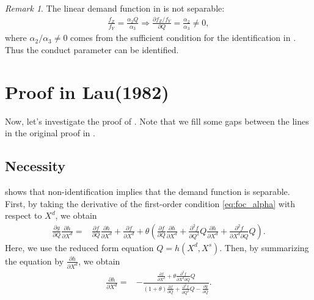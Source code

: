 \documentclass[11pt, a4paper]{article}
\theoremstyle{remark}
\newtheorem{remark}{Remark}
\begin{document}
\begin{remark}
    The linear demand function in \citet{bresnahan1982oligopoly} is not separable:
    \begin{align}
        \frac{f_Z}{f_Y} = \frac{\alpha_2 Q}{\alpha_3} \Longrightarrow \frac{\partial f_Z/f_Y}{\partial Q} = \frac{\alpha_2}{\alpha_3} \ne 0,
    \end{align}
    where $\alpha_2/\alpha_3 \ne 0$ comes from the sufficient condition for the identification in \citet{matsumura2023resolving}.
    Thus the conduct parameter can be identified.
\end{remark}



\section{Proof in Lau(1982)}\label{sec:proof_lau}
Now, let's investigate the proof of \citet{lau1982identifying}.
Note that we fill some gaps between the lines in the original proof in \citet{lau1982identifying}.

\subsection{Necessity}
\citet{lau1982identifying} shows that non-identification implies that the demand function is separable.
First, by taking the derivative of the first-order condition \eqref{eq:foc_alpha} with respect to $X^{d}$, we obtain
\begin{align}
    \frac{\partial g}{\partial Q}\frac{\partial h}{\partial X^{d}} = & \frac{\partial f}{\partial Q}\frac{\partial h}{\partial X^{d}} + \frac{\partial f}{\partial X^{d}} + \theta\left(\frac{\partial f}{\partial Q}\frac{\partial h}{\partial X^{d}}  + \frac{\partial^2 f}{\partial Q^2}Q\frac{\partial h}{\partial X^{d}} + \frac{\partial^2 f}{\partial X^{d}\partial Q}Q \right).
\end{align}
Here, we use the reduced form equation $Q = h(X^{d}, X^{s})$.
Then, by summarizing the equation by $\frac{\partial h}{\partial X^{d}}$, we obtain
\begin{align}
    \frac{\partial h}{\partial X^{d}} = & -\frac{\frac{\partial f}{\partial X^{d}} + \theta \frac{\partial^2 f}{\partial X^{d}\partial Q}Q }{(1+\theta)\frac{\partial f}{\partial Q} + \frac{\partial^2 f}{\partial Q^2}Q - \frac{\partial g}{\partial Q}}. \label{eq:foc_derivative_demand}
\end{align}
\end{document}

